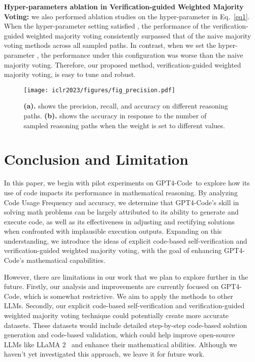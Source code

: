 \documentclass{article} \usepackage{iclr2023_conference,times}
\newcommand{\gptcode}{GPT4-Code}
\begin{document}
\textbf{Hyper-parameters ablation in Verification-guided Weighted Majority Voting:} we also performed ablation studies on the hyper-parameter  in Eq.~\ref{eq1}. When the hyper-parameter setting satisfied , the performance of the verification-guided weighted majority voting consistently surpassed that of the naive majority voting methods across all sampled paths. In contrast, when we set the hyper-parameter , the performance under this configuration was worse than the naive majority voting. Therefore, our proposed method, verification-guided weighted majority voting, is easy to tune and robust.






\begin{figure}[t]
    \centering
    \texttt{[image: iclr2023/figures/fig\_precision.pdf]}
    \vspace{-5mm}
    \caption{\textbf{(a).} shows the precision, recall, and accuracy on different reasoning paths. \textbf{(b).} shows the accuracy in response to the number of sampled reasoning paths when the weight is set to different values.}
\label{fig:analysis_voting}
\end{figure}



\section{Conclusion and Limitation}


In this paper, we begin with pilot experiments on \gptcode~to explore how its use of code impacts its performance in mathematical reasoning. By analyzing Code Usage Frequency and accuracy, we determine that \gptcode's skill in solving math problems can be largely attributed to its ability to generate and execute code, as well as its effectiveness in adjusting and rectifying solutions when confronted with implausible execution outputs. Expanding on this understanding, we introduce the ideas of explicit code-based self-verification and verification-guided weighted majority voting, with the goal of enhancing \gptcode's mathematical capabilities.

However, there are limitations in our work that we plan to explore further in the future. Firstly, our analysis and improvements are currently focused on \gptcode, which is somewhat restrictive. We aim to apply the methods to other LLMs. Secondly, our explicit code-based self-verification and verification-guided weighted majority voting technique could potentially create more accurate datasets. These datasets would include detailed step-by-step code-based solution generation and code-based validation, which could help improve open-source LLMs like LLaMA 2~\citep{touvron2023llama} and enhance their mathematical abilities. Although we haven't yet investigated this approach, we leave it for future work.
\end{document}
